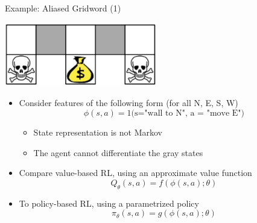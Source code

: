\begin{frame}[c]{Example: Aliased Gridword (1)}
	
	\begin{center}
		\includegraphics[width=0.5\textwidth]{images/gridworld1.png}
	\end{center}
	
	\begin{itemize}
		\item Consider features of the following form (for all N, E, S, W)
		$$\phi(s,a) = 1\text{(s="wall to N", a = "move E")}$$
		\vspace{-1em}
		\begin{itemize}
			\item State representation is not Markov
			\item The agent \alert{cannot} differentiate the gray states
		\end{itemize}
		\item Compare value-based RL, using an approximate value function
		$$Q_\theta (s,a) = f(\phi(s,a); \theta)$$
		\item To policy-based RL, using a parametrized policy
		$$\pi_\theta(s,a) = g(\phi(s,a); \theta) $$ 
	\end{itemize}
	
\end{frame}
